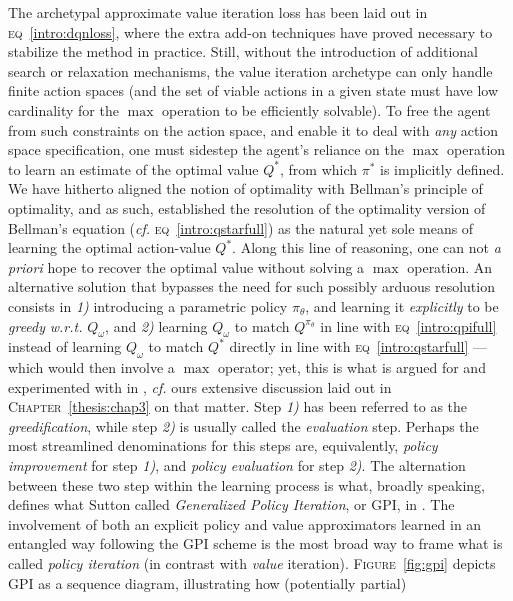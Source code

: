 The archetypal approximate value iteration loss has been laid out in \textsc{eq}~\ref{intro:dqnloss},
where the extra add-on techniques have proved necessary to stabilize the method in practice.
Still, without the introduction of additional search or relaxation mechanisms,
the value iteration archetype can only handle finite action spaces (and the set of
viable actions in a given state must have low cardinality for the $\max$ operation to be efficiently solvable).
To free the agent from such constraints on the action space,
and enable it to deal with \emph{any} action space specification,
one must sidestep the agent's reliance on the $\max$ operation
to learn an estimate of the optimal value $Q^*$, from which $\pi^*$ is implicitly defined.
We have hitherto aligned the notion of optimality with Bellman's principle of optimality,
and as such, established the resolution of the optimality version of Bellman's equation
(\textit{cf.} \textsc{eq}~\ref{intro:qstarfull}) as the natural yet sole
means of learning the optimal action-value $Q^*$.
Along this line of reasoning,
one can not \textit{a priori} hope to recover the optimal value without solving a $\max$ operation.
An alternative solution that bypasses the need for such possibly arduous resolution
consists in
\textit{1)} introducing a parametric policy $\pi_\theta$, and learning it \emph{explicitly}
to be \emph{greedy} \textit{w.r.t.} $Q_\omega$, and
\textit{2)} learning $Q_\omega$ to match $Q^{\pi_\theta}$ in line with \textsc{eq}~\ref{intro:qpifull}
instead of learning $Q_\omega$ to match $Q^*$ directly in line with \textsc{eq}~\ref{intro:qstarfull}
--- which would then involve a $\max$ operator;
yet, this is what is argued for and experimented with in \cite{Crites1995-hn},
\textit{cf.} ours extensive discussion laid out in \textsc{Chapter}~\ref{thesis:chap3} on that matter.
Step \textit{1)} has been referred to as the \emph{greedification},
while step \textit{2)} is usually called the \emph{evaluation} step.
Perhaps the most streamlined denominations for this steps are, equivalently,
\emph{policy improvement} for step \textit{1)},
and \emph{policy evaluation} for step \textit{2)}.
The alternation between these two step within the learning process is what,
broadly speaking, defines what Sutton called \emph{Generalized Policy Iteration}, or GPI,
in \cite{Sutton1998-ow}. The involvement of both an explicit policy and value approximators
learned in an entangled way following the GPI scheme is the most broad way to frame
what is called \emph{policy iteration} (in contrast with \textit{value} iteration).
\textsc{Figure}~\ref{fig:gpi} depicts GPI as a sequence diagram, illustrating how (potentially partial)
